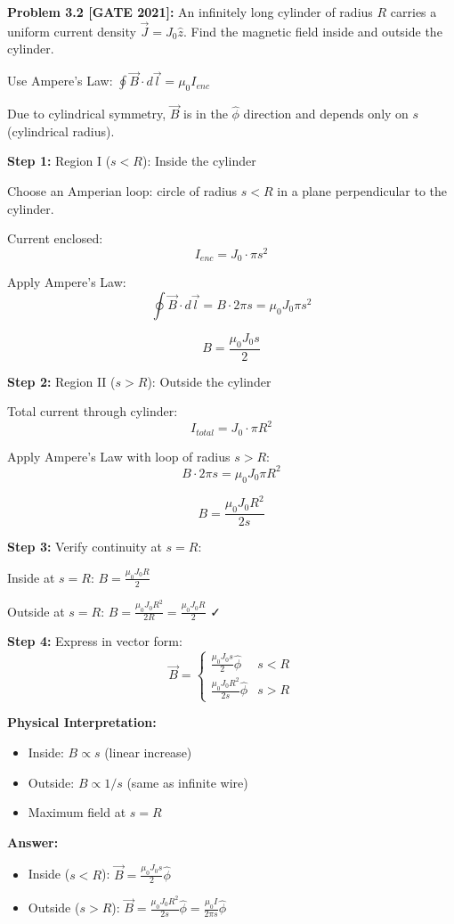 \documentclass[12pt,a4paper]{article}
\begin{document}
\textbf{Problem 3.2 [GATE 2021]:} An infinitely long cylinder of radius $R$ carries a uniform current density $\vec{J} = J_0\hat{z}$. Find the magnetic field inside and outside the cylinder.

\begin{solution}
Use Ampere's Law: $\oint \vec{B} \cdot d\vec{l} = \mu_0 I_{enc}$

Due to cylindrical symmetry, $\vec{B}$ is in the $\hat{\phi}$ direction and depends only on $s$ (cylindrical radius).

\textbf{Step 1:} Region I ($s < R$): Inside the cylinder

Choose an Amperian loop: circle of radius $s < R$ in a plane perpendicular to the cylinder.

Current enclosed:
$$I_{enc} = J_0 \cdot \pi s^2$$

Apply Ampere's Law:
$$\oint \vec{B} \cdot d\vec{l} = B \cdot 2\pi s = \mu_0 J_0 \pi s^2$$

$$B = \frac{\mu_0 J_0 s}{2}$$

\textbf{Step 2:} Region II ($s > R$): Outside the cylinder

Total current through cylinder:
$$I_{total} = J_0 \cdot \pi R^2$$

Apply Ampere's Law with loop of radius $s > R$:
$$B \cdot 2\pi s = \mu_0 J_0 \pi R^2$$

$$B = \frac{\mu_0 J_0 R^2}{2s}$$

\textbf{Step 3:} Verify continuity at $s = R$:

Inside at $s = R$: $B = \frac{\mu_0 J_0 R}{2}$

Outside at $s = R$: $B = \frac{\mu_0 J_0 R^2}{2R} = \frac{\mu_0 J_0 R}{2}$ ✓

\textbf{Step 4:} Express in vector form:
$$\vec{B} = \begin{cases}
\frac{\mu_0 J_0 s}{2}\hat{\phi} & s < R \\
\frac{\mu_0 J_0 R^2}{2s}\hat{\phi} & s > R
\end{cases}$$

\textbf{Physical Interpretation:}
\begin{itemize}
    \item Inside: $B \propto s$ (linear increase)
    \item Outside: $B \propto 1/s$ (same as infinite wire)
    \item Maximum field at $s = R$
\end{itemize}

\textbf{Answer:}
\begin{itemize}
    \item Inside ($s < R$): $\vec{B} = \frac{\mu_0 J_0 s}{2}\hat{\phi}$
    \item Outside ($s > R$): $\vec{B} = \frac{\mu_0 J_0 R^2}{2s}\hat{\phi} = \frac{\mu_0 I}{2\pi s}\hat{\phi}$
\end{itemize}
\end{solution}
\end{document}
